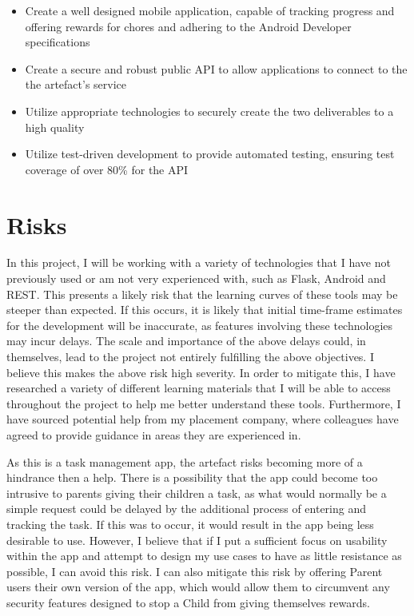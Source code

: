 \begin{itemize}
	\item Create a well designed mobile application, capable of tracking progress and offering rewards for chores and adhering to the Android Developer specifications
	\item Create a secure and robust public API to allow applications to connect to the the artefact's service
	\item Utilize appropriate technologies to securely create the two deliverables to a high quality
	\item Utilize test-driven development to provide automated testing, ensuring test coverage of over 80\% for the API
\end{itemize}

\section{Risks}
In this project, I will be working with a variety of technologies that I have not previously used or am not very experienced with, such as Flask, Android and REST. 
This presents a likely risk that the learning curves of these tools may be steeper than expected.
If this occurs, it is likely that initial time-frame estimates for the development will be inaccurate, as features involving these technologies may incur delays.
The scale and importance of the above delays could, in themselves, lead to the project not entirely fulfilling the above objectives. I believe this makes the above risk high severity.
In order to mitigate this, I have researched a variety of different learning materials that I will be able to access throughout the project to help me better understand these tools.
Furthermore, I have sourced potential help from my placement company, where colleagues have agreed to provide guidance in areas they are experienced in.

As this is a task management app, the artefact risks becoming more of a hindrance then a help.
There is a possibility that the app could become too intrusive to parents giving their children a task, as what would normally be a simple request could be delayed by the additional process of entering and tracking the task.
If this was to occur, it would result in the app being less desirable to use.
However, I believe that if I put a sufficient focus on usability within the app and attempt to design my use cases to have as little resistance as possible, I can avoid this risk.
I can also mitigate this risk by offering Parent users their own version of the app, which would allow them to circumvent any security features designed to stop a Child from giving themselves rewards.